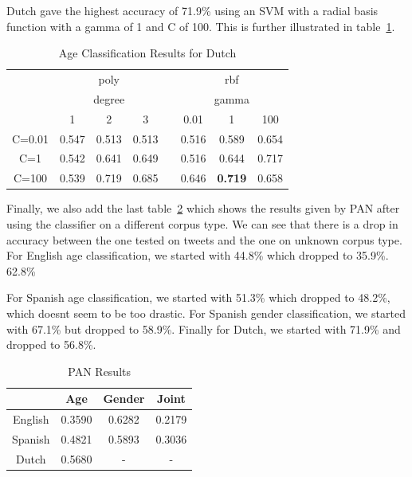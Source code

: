 \documentclass[conference]{IEEEtran}
\begin{document}
Dutch gave the highest accuracy of 71.9\% using an SVM with a radial basis function with a gamma of 1 and C of 100. This is further illustrated in table~\ref{DutchAge}. 
\begin{table}[!htbp]
\centering
\caption{Age Classification Results for Dutch}
\label{DutchAge}
\setlength{\tabcolsep}{0.5em}
{\renewcommand{\arraystretch}{1.2}%
\begin{tabular}{cccccccc}
\toprule
     & \multicolumn{3}{c}{poly}   &  & \multicolumn{3}{c}{rbf}   \\
     & \multicolumn{3}{c}{degree} &  & \multicolumn{3}{c}{gamma} \\
    & 1       & 2       & 3      &  & 0.01    & 1       & 100   \\
\midrule
C=0.01 & 0.547   & 0.513   & 0.513  &  & 0.516   & 0.589   & 0.654 \\
C=1    & 0.542   & 0.641   & 0.649  &  & 0.516   & 0.644   & 0.717 \\
C=100  & 0.539   & 0.719   & 0.685  &  & 0.646   & \textbf{0.719}   & 0.658 \\
\bottomrule
\end{tabular}
}
\end{table}

Finally, we also add the last table~\ref{PANResults} which shows the results given by PAN after using the classifier on a different corpus type. We can see that there is a drop in accuracy between the one tested on tweets and the one on unknown corpus type. For English age classification, we started with 44.8\% which dropped to 35.9\%. 62.8\%

For Spanish age classification, we started with 51.3\% which dropped to 48.2\%, which doesnt seem to be too drastic. For Spanish gender classification, we started with 67.1\% but dropped to 58.9\%. Finally for Dutch, we started with 71.9\% and dropped to 56.8\%.
\begin{table}[!htbp]
\centering
\caption{PAN Results}
\label{PANResults}
\setlength{\tabcolsep}{0.5em}
{\renewcommand{\arraystretch}{1.2}%
\begin{tabular}{cccc}
\toprule
        & Age    & Gender & Joint  \\
\midrule
English & 0.3590 & 0.6282 & 0.2179 \\
Spanish & 0.4821 & 0.5893 & 0.3036 \\
Dutch   & 0.5680 &   -     &  -    \\
\bottomrule 
\end{tabular}
}
\end{table}
\end{document}
